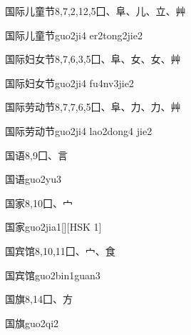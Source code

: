 \begin{Entry}{国际儿童节}{8,7,2,12,5}{⼞、⾩、⼉、⽴、⾋}
  \begin{Phonetics}{国际儿童节}{guo2ji4 er2tong2jie2}
  \end{Phonetics}
\end{Entry}

\begin{Entry}{国际妇女节}{8,7,6,3,5}{⼞、⾩、⼥、⼥、⾋}
  \begin{Phonetics}{国际妇女节}{guo2ji4 fu4nv3jie2}
  \end{Phonetics}
\end{Entry}

\begin{Entry}{国际劳动节}{8,7,7,6,5}{⼞、⾩、⼒、⼒、⾋}
  \begin{Phonetics}{国际劳动节}{guo2ji4 lao2dong4 jie2}
  \end{Phonetics}
\end{Entry}

\begin{Entry}{国语}{8,9}{⼞、⾔}
  \begin{Phonetics}{国语}{guo2yu3}
  \end{Phonetics}
\end{Entry}

\begin{Entry}{国家}{8,10}{⼞、⼧}
  \begin{Phonetics}{国家}{guo2jia1}[][HSK 1]
  \end{Phonetics}
\end{Entry}

\begin{Entry}{国宾馆}{8,10,11}{⼞、⼧、⾷}
  \begin{Phonetics}{国宾馆}{guo2bin1guan3}
  \end{Phonetics}
\end{Entry}

\begin{Entry}{国旗}{8,14}{⼞、⽅}
  \begin{Phonetics}{国旗}{guo2qi2}
  \end{Phonetics}
\end{Entry}

